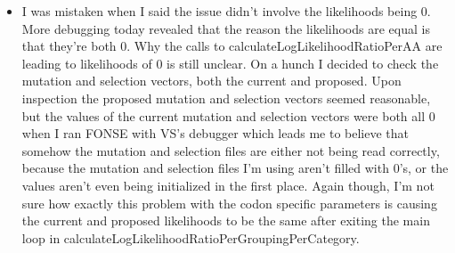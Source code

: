 \documentclass[11pt]{labbook}
\begin{document}
    \begin{itemize}
        \item I was mistaken when I said the issue didn't involve the likelihoods being 0. More debugging today revealed that the reason the likelihoods are equal is that they're both 0. Why the calls to calculateLogLikelihoodRatioPerAA are leading to likelihoods of 0 is still unclear. On a hunch I decided to check the mutation and selection vectors, both the current and proposed. Upon inspection the proposed mutation and selection vectors seemed reasonable, but the values of the current mutation and selection vectors were both all 0 when I ran FONSE with VS's debugger which leads me to believe that somehow the mutation and selection files are either not being read correctly, because the mutation and selection files I'm using aren't filled with 0's, or the values aren't even being initialized in the first place. Again though, I'm not sure how exactly this problem with the codon specific parameters is causing the current and proposed likelihoods to be the same after exiting the main loop in calculateLogLikelihoodRatioPerGroupingPerCategory.
    \end{itemize}
    
\end{document}
